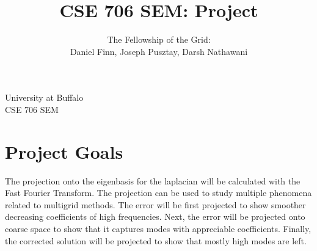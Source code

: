 \documentclass{article}
\begin{document}
\begin{titlepage}

\title{CSE 706 SEM: Project}
\author{The Fellowship of the Grid: \\
Daniel Finn, Joseph Pusztay, Darsh Nathawani}
\date{}
\maketitle
	\begin{center}
		University at Buffalo\\
		CSE 706 SEM\\
	\end{center}
\end{titlepage}

\section{Project Goals}

The projection onto the eigenbasis for the laplacian will be calculated with the Fast Fourier Transform.   The projection can be used to study multiple phenomena related to multigrid methods.  The error will be first projected to show smoother decreasing coefficients of high frequencies.  Next, the error will be projected onto coarse space to show that it captures modes with appreciable coefficients.  Finally, the corrected solution will be projected to show that mostly high modes are left.
\end{document}
